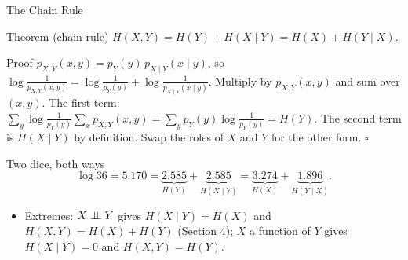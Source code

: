 \begin{frame}{The Chain Rule}
  \small
  \begin{block}{Theorem (chain rule)}
    $H(X,Y)=H(Y)+H(X\mid Y)=H(X)+H(Y\mid X)$.
  \end{block}
  \begin{block}{Proof}
    $p_{X,Y}(x,y)=p_Y(y)\,p_{X\mid Y}(x\mid y)$, so $\log\frac1{p_{X,Y}(x,y)}=\log\frac1{p_Y(y)}+\log\frac1{p_{X\mid Y}(x\mid y)}$. Multiply by $p_{X,Y}(x,y)$ and sum over $(x,y)$.
    The first term: $\sum_y\log\frac1{p_Y(y)}\sum_xp_{X,Y}(x,y)=\sum_yp_Y(y)\log\frac1{p_Y(y)}=H(Y)$. The second term is $H(X\mid Y)$ by definition. Swap the roles of $X$ and $Y$ for the other form. \hfill$\square$
  \end{block}
  \begin{exampleblock}{Two dice, both ways}
    \[
      \log36=5.170=\underbrace{2.585}_{H(Y)}+\underbrace{2.585}_{H(X\mid Y)}=\underbrace{3.274}_{H(X)}+\underbrace{1.896}_{H(Y\mid X)} .
    \]
  \end{exampleblock}
  \begin{itemize}
    \item Extremes: $X\perp\!\!\!\perp Y$ gives $H(X\mid Y)=H(X)$ and $H(X,Y)=H(X)+H(Y)$ (Section 4); $X$ a function of $Y$ gives $H(X\mid Y)=0$ and $H(X,Y)=H(Y)$.
  \end{itemize}
\end{frame}

